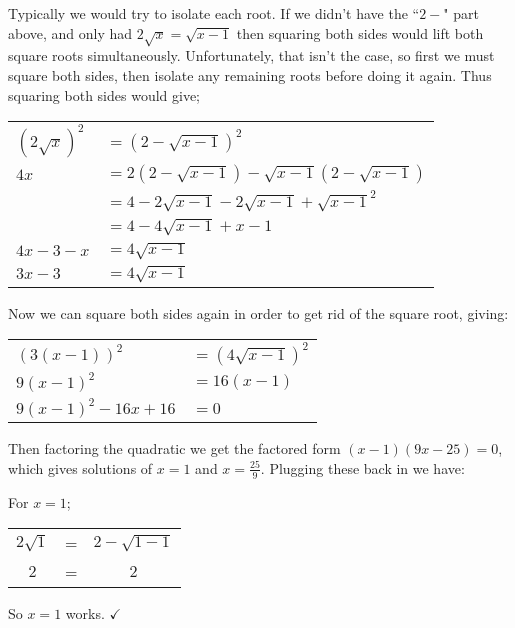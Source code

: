 \documentclass{ximeraXloud}
\begin{document}
    \begin{example}[Find all $x$ that satisfy the equation $2\sqrt{x} = 2 - \sqrt{x - 1}$]%
        Typically we would try to isolate each root. If we didn't have the ``$2 -$" part above, and only had $2\sqrt{x} = \sqrt{x - 1}$ then squaring both sides would lift both square roots simultaneously. Unfortunately, that isn't the case, so first we must square both sides, then isolate any remaining roots before doing it again. Thus squaring both sides would give;\\
        \begin{center}
            \begin{tabular}{ll}
                $(2\sqrt{x})^2$ &$= (2 - \sqrt{x - 1})^2$                                   \\
                $4x$            &$= 2(2 - \sqrt{x - 1}) - \sqrt{x - 1}(2 - \sqrt{x - 1})$   \\
                                &$= 4 - 2\sqrt{x - 1} - 2\sqrt{x - 1} + \sqrt{x - 1}^2$     \\
                                &$= 4 - 4\sqrt{x - 1} + x - 1$                              \\
                $4x - 3 - x $   &$= 4\sqrt{x - 1}$                                          \\
                $3x - 3$        &$= 4\sqrt{x - 1}$
            \end{tabular}
        \end{center}
        Now we can square both sides again in order to get rid of the square root, giving:
        \begin{center}
            \begin{tabular}{ll}
                $(3(x-1))^2$            & $ = (4\sqrt{x - 1})^2$    \\
                $ 9(x-1)^2 $            & $= 16(x - 1)$             \\
                $9(x-1)^2 - 16x + 16$   & $ = 0$
            \end{tabular}
        \end{center}
        Then factoring the quadratic we get the factored form $(x-1)(9x-25) = 0$, which gives solutions of $x = 1$ and $x = \frac{25}{9}$. Plugging these back in we have:

        For $x = 1$;
        \begin{tabular}{ccc}
            $2\sqrt{1}$ & = & $2 - \sqrt{1 - 1}$    \\
            $2$         & = & $2$
        \end{tabular}
        So $x = 1$ works. $\checkmark$


\end{example}
\end{document}
